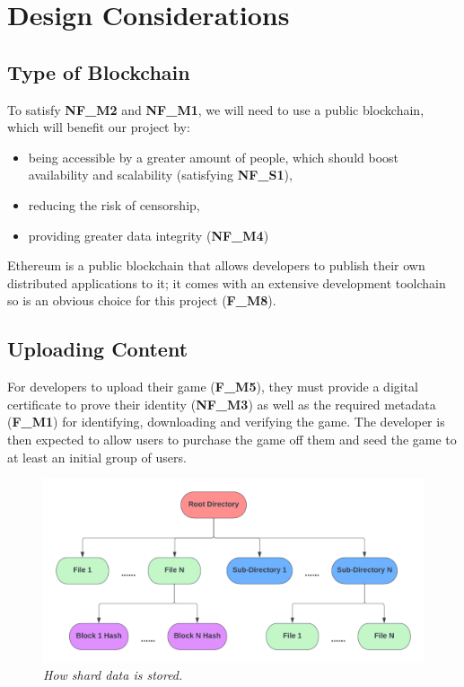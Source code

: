 
\section{Design Considerations}

\subsection*{Type of Blockchain}

To satisfy \textbf{NF\_M2} and \textbf{NF\_M1}, we will need to use a public blockchain, which will benefit our project by:

\begin{itemize}
  \item being accessible by a greater amount of people, which should boost availability and scalability (satisfying \textbf{NF\_S1}),
  \item reducing the risk of censorship,
  \item providing greater data integrity (\textbf{NF\_M4})
\end{itemize}

\noindent Ethereum is a public blockchain that allows developers to publish their own distributed applications to it; it comes with an extensive development toolchain so is an obvious choice for this project (\textbf{F\_M8}).


\subsection*{Uploading Content}
\label{subsec:upload-content}

For developers to upload their game (\textbf{F\_M5}), they must provide a digital certificate to prove their identity (\textbf{NF\_M3}) as well as the required metadata (\textbf{F\_M1}) for identifying, downloading and verifying the game. The developer is then expected to allow users to purchase the game off them and seed the game to at least an initial group of users.

\begin{figure}[ht]
  \centering
  \includegraphics[width=.85\textwidth]{images/diagrams/block-body.png}
  \caption{\textit{How shard data is stored.}}
  \label{fig:hash-storage}
\end{figure}

